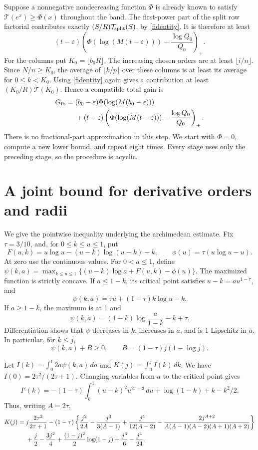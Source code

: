 \documentclass[11pt]{article}
\newcommand{\Tn}{\mathcal T}
\begin{document}
Suppose a nonnegative nondecreasing function \(\Phi\) is already
known to satisfy \(\Tn(e^x)\ge\Phi(x)\) throughout the band.
The first-power part of the split row factorial contributes exactly
\((S/R)\Tn_{\rm split}(S)\), by \eqref{fidentity}. It is therefore
at least
\[
 (t-\varepsilon)
 \left(\Phi(\log(M(t-\varepsilon)))-\frac{\log Q_0}{Q_0}\right)_+.
\]
For the columns put \(K_0=\lfloor b_0R\rfloor\). The increasing
chosen orders are at least \(\lfloor i/n\rfloor\).
Since \(N/n\ge K_0\), the average of \(\lfloor k/p\rfloor\)
over these columns is at least its average for \(0\le k<K_0\).
Using \eqref{fidentity} again gives a contribution at least
\((K_0/R)\Tn(K_0)\). Hence a compatible total gain is
\begin{align}\label{Gfeedback}
 G_{\rm fb}={}&(b_0-\varepsilon)
       \Phi(\log(M(b_0-\varepsilon)))\\
 &+(t-\varepsilon)
       \left(\Phi(\log(M(t-\varepsilon)))-\frac{\log Q_0}{Q_0}\right)_+.
 \notag
\end{align}
There is no fractional-part approximation in this step. We start
with \(\Phi=0\), compute a new lower bound, and repeat eight times.
Every stage uses only the preceding stage, so the procedure is acyclic.

\section{A joint bound for derivative orders and radii}\label{arch}
We give the pointwise inequality underlying the archimedean estimate.
Fix \(\tau=3/10\), and, for \(0\le k\le u\le1\), put
\[
 F(u,k)=u\log u-(u-k)\log(u-k)-k,\qquad
 \phi(u)=\tau(u\log u-u).
\]
At zero use the continuous values. For \(0<a\le1\), define
\(\psi(k,a)=\max_{k\le u\le1}\{(u-k)\log a+F(u,k)-\phi(u)\}\).
The maximized function is strictly concave. If \(a\le1-k\), its
critical point satisfies \(u-k=au^{1-\tau}\), and
\[
 \psi(k,a)=\tau u+(1-\tau)k\log u-k.
\]
If \(a\ge1-k\), the maximum is at 1 and
\[
 \psi(k,a)=(1-k)\log\frac a{1-k}-k+\tau.
\]
Differentiation shows that \(\psi\) decreases in \(k\), increases in
\(a\), and is 1-Lipschitz in \(a\). In particular, for \(k\le j\),
\[
 \psi(k,a)+B\ge0,\qquad B=(1-\tau)j(1-\log j).
\]

Let \(I(k)=\int_0^1 2a\psi(k,a)\,da\) and
\(K(j)=\int_0^j I(k)\,dk\). We have \(I(0)=2\tau^2/(2\tau+1)\).
Changing variables from \(a\) to the critical point gives
\[
 I'(k)=-(1-\tau)\int_k^1(u-k)^2u^{2\tau-3}\,du
               +\log(1-k)+k-k^2/2.
\]
Thus, writing \(A=2\tau\),
\begin{align}\label{Kformula}
 K(j)={}&j\frac{2\tau^2}{2\tau+1}
 -(1-\tau)\left\{\frac{j^2}{2A}-\frac{j^3}{3(A-1)}
 +\frac{j^4}{12(A-2)}
 -\frac{2j^{A+2}}{A(A-1)(A-2)(A+1)(A+2)}\right\}\\
 &+\frac j2-\frac{3j^2}4+\frac{(1-j)^2}2\log(1-j)
        +\frac{j^3}6-\frac{j^4}{24}.
 \notag
\end{align}
\end{document}

